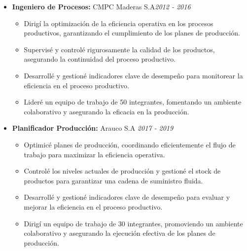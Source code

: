 \documentclass[a4paper,10pt]{article}
\begin{document}
\begin{itemize}[left=0pt]
		\item \textbf{\large Ingeniero de Procesos:}  CMPC Maderas S.A\hfill \textit{2012 - 2016} 
		\begin{itemize}[left=10pt, topsep=0pt]
			\item Dirigí la optimización de la eficiencia operativa en los procesos productivos, garantizando el cumplimiento de los planes de producción.
			\item Supervisé y controlé rigurosamente la calidad de los productos, asegurando la continuidad del proceso productivo.
			\item Desarrollé y gestioné indicadores clave de desempeño para monitorear la eficiencia en el proceso productivo.
			\item Lideré un equipo de trabajo de 50 integrantes, fomentando un ambiente colaborativo y asegurando la eficacia en la producción.
		\end{itemize}
		
		\item \textbf{\large Planificador Producción:} Arauco S.A \hfill \textit{2017 - 2019} 
		\begin{itemize}[left=10pt, topsep=0pt]
			\item Optimicé planes de producción, coordinando eficientemente el flujo de trabajo para maximizar la eficiencia operativa.
			\item Controlé los niveles actuales de producción y gestioné el stock de productos para garantizar una cadena de suministro fluida.
			\item Desarrollé y gestioné indicadores clave de desempeño para evaluar y mejorar la eficiencia en el proceso productivo.
			\item Dirigí un equipo de trabajo de 30 integrantes, promoviendo un ambiente colaborativo y asegurando la ejecución efectiva de los planes de producción.
		\end{itemize}
	\end{itemize}
	
	
\end{document}
